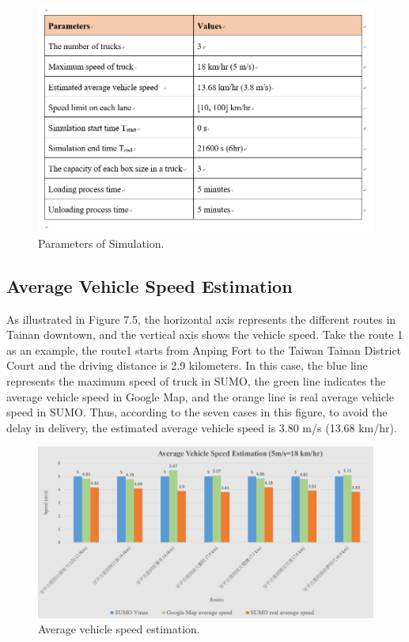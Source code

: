 \documentclass[12pt]{ksthesis}
\begin{document}
\begin{thesis}
{\begin{figure}[H]
\centering
\includegraphics[width=1.0\textwidth]{./Thesis_figures/F7-4_parameters.PNG}
\caption{\large Parameters of Simulation.}
\vspace{0.5cm}
\label{Fig:Parameters_of_Simulation}
\end{figure}

\subsection{Average Vehicle Speed Estimation}

As illustrated in Figure 7.5, the horizontal axis represents the different routes in Tainan downtown, and the vertical axis shows the vehicle speed. Take the route 1 as an example, the route1 starts from Anping Fort to the Taiwan Tainan District Court and the driving distance is 2.9 kilometers. In this case, the blue line represents the maximum speed of truck in SUMO, the green line indicates the average vehicle speed in Google Map, and the orange line is real average vehicle speed in SUMO. Thus, according to the seven cases in this figure, to avoid the delay in delivery, the estimated average vehicle speed is 3.80 m/s (13.68 km/hr).


\begin{figure}[H]
\centering
\includegraphics[width=1.14\textwidth]{./Thesis_figures/F7-5_speedEstimation.PNG}
\caption{\large Average vehicle speed estimation.}
\vspace{0.5cm}
\label{Fig:Average_vehicleSpeedEstimation}
\end{figure}

}
\end{thesis}
\end{document}
